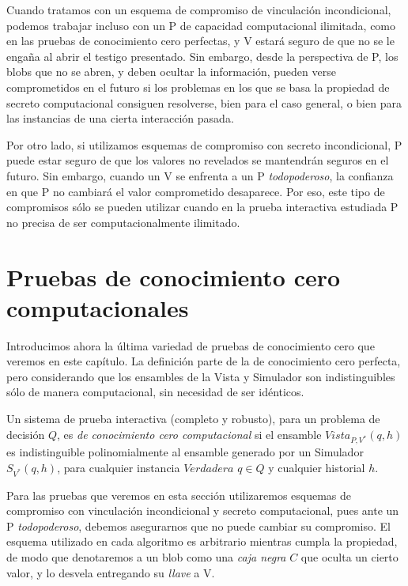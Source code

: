 Cuando tratamos con un esquema de compromiso de vinculación incondicional, podemos trabajar incluso con un P de capacidad computacional ilimitada, como en las pruebas de conocimiento cero perfectas, y V estará seguro de que no se le engaña al abrir el testigo presentado. Sin embargo, desde la perspectiva de P, los blobs que no se abren, y deben ocultar la información, pueden verse comprometidos en el futuro si los problemas en los que se basa la propiedad de secreto computacional consiguen resolverse, bien para el caso general, o bien para las instancias de una cierta interacción pasada.

Por otro lado, si utilizamos esquemas de compromiso con secreto incondicional, P puede estar seguro de que los valores no revelados se mantendrán seguros en el futuro. Sin embargo, cuando un V se enfrenta a un P \textit{todopoderoso}, la confianza en que P no cambiará el valor comprometido desaparece. Por eso, este tipo de compromisos sólo se pueden utilizar cuando en la prueba interactiva estudiada P no precisa de ser computacionalmente ilimitado.






\section{Pruebas de conocimiento cero computacionales}


Introducimos ahora la última variedad de pruebas de conocimiento cero que veremos en este capítulo. La definición parte de la de conocimiento cero perfecta, pero considerando que los ensambles de la Vista y Simulador son indistinguibles sólo de manera computacional, sin necesidad de ser idénticos.


\begin{definition}
	\hfil
	
	Un sistema de prueba interactiva (completo y robusto), para un problema de decisión $Q$, es \textit{de conocimiento cero computacional} si el ensamble $Vista_{P,V^*}(q,h)$ es indistinguible polinomialmente al ensamble generado por un Simulador $S_{V^*}(q,h)$, para cualquier instancia $Verdadera$ $q\in Q$ y cualquier historial $h$.
\end{definition}

\hfil


Para las pruebas que veremos en esta sección utilizaremos esquemas de compromiso con vinculación incondicional y secreto computacional, pues ante un P \textit{todopoderoso}, debemos asegurarnos que no puede cambiar su compromiso. El esquema utilizado en cada algoritmo es arbitrario mientras cumpla la propiedad, de modo que denotaremos a un blob como una \textit{caja negra} $C$ que oculta un cierto valor, y lo desvela entregando su \textit{llave} a V.


